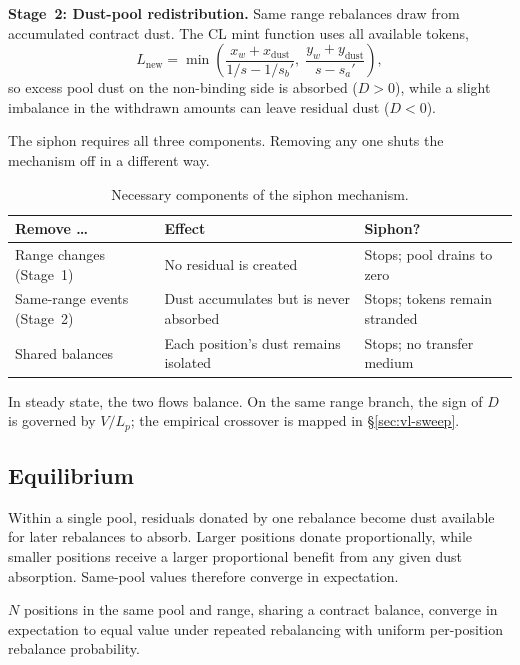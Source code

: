 \documentclass{manuscript}
\renewcommand{\arraystretch}{1.2}
\begin{document}
\textbf{Stage~2: Dust-pool redistribution.} Same range rebalances draw from accumulated contract dust. The CL mint function uses all available tokens,
\begin{equation}\label{eq:mint}
L_{\text{new}} = \min\!\left(\frac{x_w + x_{\text{dust}}}{1/s - 1/s_b'}, \; \frac{y_w + y_{\text{dust}}}{s - s_a'}\right),
\end{equation}
so excess pool dust on the non-binding side is absorbed ($D > 0$), while a slight imbalance in the withdrawn amounts can leave residual dust ($D < 0$).

The siphon requires all three components. Removing any one shuts the mechanism off in a different way.

\begin{table}[H]
\centering
\caption{Necessary components of the siphon mechanism.}
\label{tab:siphon-components}
\renewcommand{\arraystretch}{1.05}
\begin{tabular}{@{}lll@{}}
\toprule
Remove \dots & Effect & Siphon? \\
\midrule
Range changes (Stage~1)     & No residual is created                  & Stops; pool drains to zero \\
Same-range events (Stage~2) & Dust accumulates but is never absorbed & Stops; tokens remain stranded \\
Shared balances             & Each position's dust remains isolated  & Stops; no transfer medium \\
\bottomrule
\end{tabular}
\end{table}

In steady state, the two flows balance. On the same range branch, the sign of $D$ is governed by $V/L_p$; the empirical crossover is mapped in \S\ref{sec:vl-sweep}.

\subsection{Equilibrium}\label{sec:equilibrium}

Within a single pool, residuals donated by one rebalance become dust available for later rebalances to absorb. Larger positions donate proportionally, while smaller positions receive a larger proportional benefit from any given dust absorption. Same-pool values therefore converge in expectation.

\begin{theorem}\label{thm:convergence}
$N$ positions in the same pool and range, sharing a contract balance, converge in expectation to equal value under repeated rebalancing with uniform per-position rebalance probability.
\end{theorem}
\end{document}
